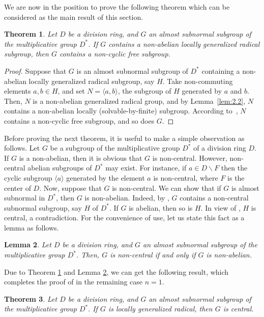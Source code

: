 \documentclass{amsart}
\newtheorem{theorem}{Theorem}[section]
\newtheorem{lemma}[theorem]{Lemma}
\theoremstyle{definition}
\begin{document}
We are now in the position to prove the following theorem which can be considered as the main result of this section.
\begin{theorem}\label{th:2.3} Let $D$ be a division ring, and $G$ an almost subnormal subgroup of the multiplicative group $D^*$. If $G$ contains a non-abelian locally generalized radical subgroup, then $G$ contains a non-cyclic free subgroup.
\end{theorem}
\begin{proof} Suppose that $G$ is an almost subnormal subgroup of $D^*$ containing a non-abelian locally generalized radical subgroup, say $H$. Take non-commuting elements $a,b\in H$, and set $N=\langle a, b\rangle$, the subgroup of $H$ generated by $a$ and $b$. Then, $N$ is a non-abelian generalized radical group, and by Lemma~\ref{lem:2.2}, $N$ contains a non-abelian locally (solvable-by-finite) subgroup. According to~\cite[Theorem 3.5]{Pa_HaiChua_2025}, $N$ contains a non-cyclic free subgroup, and so does $G$. 
\end{proof}
Before proving the next theorem, it is useful to make a simple observation as follows. Let $G$ be a subgroup of the multiplicative group $D^*$ of a division ring $D$. If $G$ is a non-abelian, then it is obvious that $G$ is non-central. However, non-central abelian subgroups of $D^*$ may exist. For instance, if $a\in D\backslash F$ then the cyclic subgroup $\langle a\rangle$ generated by the element $a$ is non-central, where $F$ is the center of $D$. Now, suppose that $G$ is non-central. We can show that if $G$ is almost subnormal in $D^*$, then $G$ is non-abelian. Indeed, by \cite[Proposition 2.2 ]{Pa_Khanh-Hai_2022}, $G$ contains a non-central subnormal subgroup, say $H$ of $D^*$. If $G$ is abelian, then so is $H$. In view of \cite[Theorem 4]{Pa_Stuth_1964}, $H$ is central, a contradiction. For the convenience of use, let us state this fact as a lemma as follows.
\begin{lemma}\label{lemma 2.4}
Let $D$ be a division ring, and $G$ an almost subnormal subgroup of the multiplicative group $D^*$. Then, $G$ is non-central if and only if $G$ is non-abelian.
\end{lemma}
Due to Theorem \ref{th:2.3} and Lemma \ref{lemma 2.4}, we can get the following result, which completes the proof of \cite[Conjecture 1]{Pa_ChuaHai_2026} in the remaining case $n=1$.
\begin{theorem}\label{th:2.5} Let $D$ be a division ring, and $G$ an almost subnormal subgroup of the multiplicative group $D^*.$ If $G$ is locally generalized radical, then $G$ is central.
\end{theorem}
\end{document}
